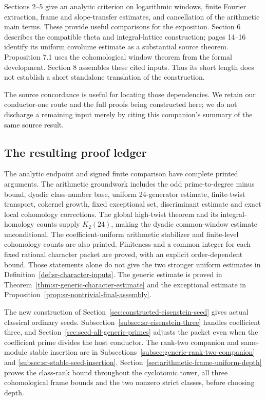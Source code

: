 Sections 2--5 give an analytic criterion on logarithmic windows,
finite Fourier extraction, frame and slope-transfer estimates,
and cancellation of the arithmetic main terms.
These provide useful comparisons for the exposition.
Section 6 describes the compatible theta and integral-lattice
construction; pages 14--16 identify its uniform covolume estimate
as a substantial source theorem.
Proposition 7.1 uses the cohomological window theorem from the
formal development. Section 8 assembles these cited inputs.
Thus its short length does not establish a short standalone
translation of the construction.

The source concordance is useful for locating those dependencies.
We retain our conductor-one route and the full proofs being
constructed here; we do not discharge a remaining input merely
by citing this companion's summary of the same source result.

\subsection{The resulting proof ledger}
The analytic endpoint and signed finite comparison have complete
printed arguments. The arithmetic groundwork includes the odd
prime-to-degree minus bound, dyadic class-number base, uniform
24-generator estimate, finite-twist transport, cokernel growth,
fixed exceptional set, discriminant estimate and exact local
cohomology corrections.
The global high-twist theorem and its integral-homology counts
supply \(K_2(24)\), making the dyadic common-window estimate
unconditional. The coefficient-uniform arithmetic stabilizer
and finite-level cohomology counts are also printed.
Finiteness and a common integer for each fixed rational character
packet are proved, with an explicit order-dependent bound.
Those statements alone do not give the two stronger uniform
estimates in Definition~\ref{def:sr-character-inputs}.
The generic estimate is proved in
Theorem~\ref{thm:sr-generic-character-estimate} and the exceptional
estimate in Proposition~\ref{prop:sr-nontrivial-final-assembly}.

The new construction of
Section~\ref{sec:constructed-eisenstein-seed} gives actual classical
ordinary seeds. Subsection~\ref{subsec:sr-eisenstein-three}
handles coefficient three, and
Section~\ref{sec:seed-all-generic-primes} adjusts the packet even
when the coefficient prime divides the host conductor.
The rank-two companion and same-module stable insertion are in
Subsections~\ref{subsec:generic-rank-two-companion} and
\ref{subsec:sr-stable-seed-insertion}.
Section~\ref{sec:arithmetic-frame-uniform-depth} proves the
class-rank bound throughout the cyclotomic tower, all three
cohomological frame bounds and the two nonzero strict classes,
before choosing depth.

